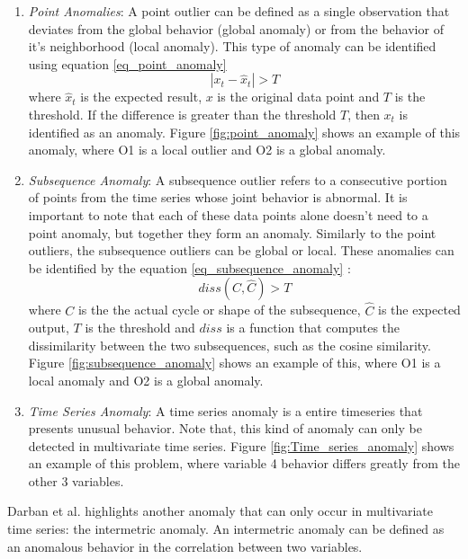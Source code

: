 \begin{enumerate}
    \item \textit{Point Anomalies}: A point outlier can be defined as a single observation that deviates from the global behavior (global anomaly) or from the behavior of it's neighborhood (local anomaly). This type of anomaly can be identified using equation \ref{eq_point_anomaly}
    \begin{equation}
        |x_t - \hat{x}_t| > T
        \label{eq_point_anomaly}
    \end{equation}
    where $\hat{x}_t$ is the expected result, $x$ is the original data point and $T$ is the threshold. If the difference is greater than the threshold $T$, then $x_t$ is identified as an anomaly. Figure \ref{fig:point_anomaly} shows an example of this anomaly, where O1 is a local outlier and O2 is a global anomaly.

    \item \textit{Subsequence Anomaly}: A subsequence outlier refers to a consecutive portion of points from the time series whose joint behavior is abnormal. It is important to note that each of these data points alone doesn't need to a point anomaly, but together they form an anomaly. Similarly to the point outliers, the subsequence outliers can be global or local. These anomalies can be identified by the equation \ref{eq_subsequence_anomaly} \cite{Zamanzadeh_Darban_Webb_Pan_Aggarwal_Salehi_2024}:
    \begin{equation}
        diss\left(C, \hat{C}\right) > T
        \label{eq_subsequence_anomaly}
    \end{equation}
    where $C$ is the the actual cycle or shape of the subsequence, $\hat{C}$ is the expected output, $T$ is the threshold and $diss$ is a function that computes the dissimilarity between the two subsequences, such as the cosine similarity. Figure \ref{fig:subsequence_anomaly} shows an example of this, where O1 is a local anomaly and O2 is a global anomaly.

    \item \textit{Time Series Anomaly}: A time series anomaly is a entire timeseries that presents unusual behavior. Note that, this kind of anomaly can only be detected in multivariate time series. Figure \ref{fig:Time_series_anomaly} shows an example of this problem, where variable 4 behavior differs greatly from the other 3 variables.
\end{enumerate}

Darban et al. \cite{Zamanzadeh_Darban_Webb_Pan_Aggarwal_Salehi_2024} highlights another anomaly that can only occur in multivariate time series: the intermetric anomaly. An intermetric anomaly can be defined as an anomalous behavior in the correlation between two variables.%


